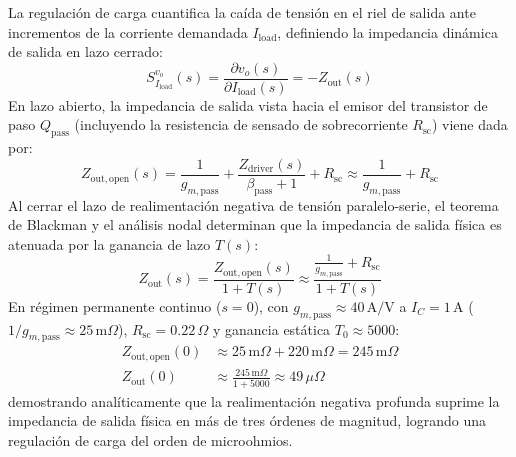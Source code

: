 La regulación de carga cuantifica la caída de tensión en el riel de salida ante incrementos de la corriente demandada $I_{\mathrm{load}}$, definiendo la impedancia dinámica de salida en lazo cerrado:
\begin{equation}
    S_{I_{\mathrm{load}}}^{v_o}(s) = \frac{\partial v_o(s)}{\partial I_{\mathrm{load}}(s)} = - Z_{\mathrm{out}}(s)
\end{equation}
En lazo abierto, la impedancia de salida vista hacia el emisor del transistor de paso $Q_{\mathrm{pass}}$ (incluyendo la resistencia de sensado de sobrecorriente $R_{\mathrm{sc}}$) viene dada por:
\begin{equation}
    Z_{\mathrm{out,open}}(s) = \frac{1}{g_{m,\mathrm{pass}}} + \frac{Z_{\mathrm{driver}}(s)}{\beta_{\mathrm{pass}} + 1} + R_{\mathrm{sc}} \approx \frac{1}{g_{m,\mathrm{pass}}} + R_{\mathrm{sc}}
    \label{eq:zout_open}
\end{equation}
Al cerrar el lazo de realimentación negativa de tensión paralelo-serie, el teorema de Blackman y el análisis nodal determinan que la impedancia de salida física es atenuada por la ganancia de lazo $T(s)$:
\begin{equation}
    Z_{\mathrm{out}}(s) = \frac{Z_{\mathrm{out,open}}(s)}{1 + T(s)} \approx \frac{\frac{1}{g_{m,\mathrm{pass}}} + R_{\mathrm{sc}}}{1 + T(s)}
    \label{eq:zout_closed}
\end{equation}
En régimen permanente continuo ($s = 0$), con $g_{m,\mathrm{pass}} \approx 40\,\mathrm{A/V}$ a $I_C = 1\,\mathrm{A}$ ($1/g_{m,\mathrm{pass}} \approx 25\,\mathrm{m}\Omega$), $R_{\mathrm{sc}} = 0.22\,\Omega$ y ganancia estática $T_0 \approx 5000$:
\begin{align}
    Z_{\mathrm{out,open}}(0) &\approx 25\,\mathrm{m}\Omega + 220\,\mathrm{m}\Omega = 245\,\mathrm{m}\Omega \\
    Z_{\mathrm{out}}(0) &\approx \frac{245\,\mathrm{m}\Omega}{1 + 5000} \approx 49\,\mu\Omega
\end{align}
demostrando analíticamente que la realimentación negativa profunda suprime la impedancia de salida física en más de tres órdenes de magnitud, logrando una regulación de carga del orden de microohmios.

